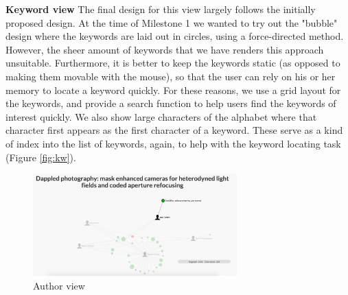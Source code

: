 \textbf{Keyword view}
The final design for this view largely follows the initially proposed design. At the time of Milestone 1 we wanted to try out the "bubble" design where the keywords are laid out in circles, using a force-directed method. However, the sheer amount of keywords that we have renders this approach unsuitable. Furthermore, it is better to keep the keywords static (as opposed to making them movable with the mouse), so that the user can rely on his or her memory to locate a keyword quickly. For these reasons, we use a grid layout for the keywords, and provide a search function to help users find the keywords of interest quickly. We also show large characters of the alphabet where that character first appears as the first character of a keyword. These serve as a kind of index into the list of keywords, again, to help with the keyword locating task (Figure \ref{fig:kw}).

\begin{figure}[ht]			
	\centering
	\includegraphics[width=0.7\textwidth]{author_view_with_tooltip}
	\caption{Author view}
	\label{fig:av}
\end{figure}